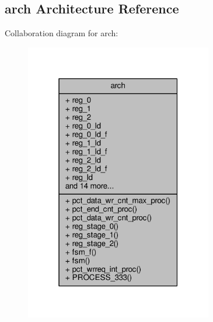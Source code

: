 \subsection{arch Architecture Reference}
\label{classdata2packets_1_1arch}


Collaboration diagram for arch\+:\nopagebreak
\begin{figure}[H]
\begin{center}
\leavevmode
\includegraphics[width=232pt]{d0/d4c/classdata2packets_1_1arch__coll__graph}
\end{center}
\end{figure}
